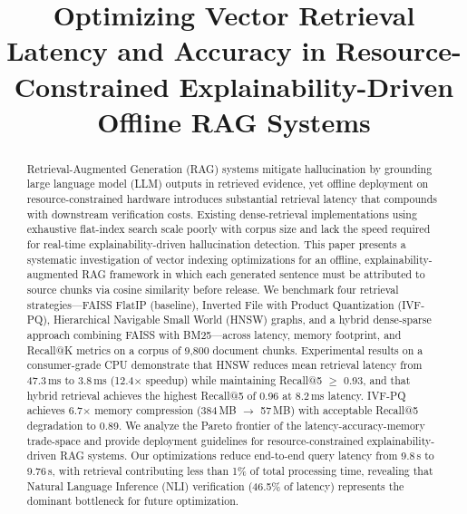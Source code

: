 \documentclass[conference]{IEEEtran}
\begin{document}
\title{Optimizing Vector Retrieval Latency and Accuracy in Resource-Constrained Explainability-Driven Offline RAG Systems}

\author{
\and
{}
\and
{}
}

\maketitle

\begin{abstract}
Retrieval-Augmented Generation (RAG) systems mitigate hallucination by grounding large language model (LLM) outputs in retrieved evidence, yet offline deployment on resource-constrained hardware introduces substantial retrieval latency that compounds with downstream verification costs. Existing dense-retrieval implementations using exhaustive flat-index search scale poorly with corpus size and lack the speed required for real-time explainability-driven hallucination detection. This paper presents a systematic investigation of vector indexing optimizations for an offline, explainability-augmented RAG framework in which each generated sentence must be attributed to source chunks via cosine similarity before release. We benchmark four retrieval strategies—FAISS FlatIP (baseline), Inverted File with Product Quantization (IVF-PQ), Hierarchical Navigable Small World (HNSW) graphs, and a hybrid dense-sparse approach combining FAISS with BM25—across latency, memory footprint, and Recall@K metrics on a corpus of 9,800 document chunks. Experimental results on a consumer-grade CPU demonstrate that HNSW reduces mean retrieval latency from 47.3\,ms to 3.8\,ms (12.4$\times$ speedup) while maintaining Recall@5 $\geq$ 0.93, and that hybrid retrieval achieves the highest Recall@5 of 0.96 at 8.2\,ms latency. IVF-PQ achieves 6.7$\times$ memory compression (384\,MB $\to$ 57\,MB) with acceptable Recall@5 degradation to 0.89. We analyze the Pareto frontier of the latency-accuracy-memory trade-space and provide deployment guidelines for resource-constrained explainability-driven RAG systems. Our optimizations reduce end-to-end query latency from 9.8\,s to 9.76\,s, with retrieval contributing less than 1\% of total processing time, revealing that Natural Language Inference (NLI) verification (46.5\% of latency) represents the dominant bottleneck for future optimization.
\end{abstract}
\end{document}
